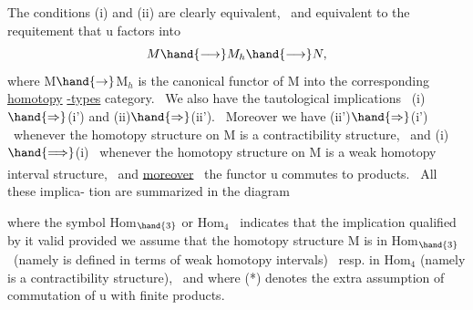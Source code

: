 The conditions (i) and (ii) are clearly equivalent, \ and equivalent
to the requitement that u factors into
\[ M\hand{\longrightarrow} M_h \hand{\longrightarrow} N , \]
where M$\hand{\rightarrow}$M$_h$ is the canonical functor of M into the corresponding \uline{homotopy}
\uline{-types} category. \ We also have the tautological implications \ (i)$\hand{\Rightarrow}$(i')
and (ii)$\hand{\Rightarrow}$(ii'). \ Moreover we have  (ii')$\hand{\Rightarrow}$(i') \ whenever the homotopy
structure on M is a contractibility structure, \ and (i)$\hand{\Longrightarrow}$(i) \ whenever
the homotopy structure on M is a weak homotopy interval structure, \ and
\uline{moreover}\textsuperscript{\hand{\unsure{*}}} \ the functor u commutes to  products. \ All these implica-%
tion are summarized in the diagram
\margin{$*$}

where the symbol Hom$_{\hand{3}}$ or Hom$_4$ \ indicates that the implication qualified by
it  valid provided we assume that the homotopy structure  M is in
Hom$_{\hand{3}}$ \ (namely is defined in terms of weak homotopy intervals) \ resp. in
Hom$_4$ (namely is a contractibility structure), \ and where (*) denotes the
extra assumption of commutation of u with finite products.

